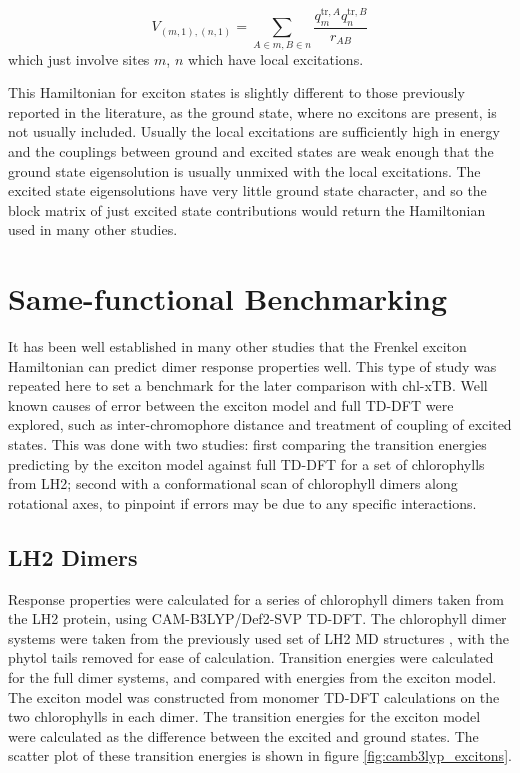 \begin{equation}
    V_{\left(m, 1\right), \left(n,1\right)} = \sum_{A \in m, B \in n} \frac{q^{\text{tr},A}_m q^{\text{tr},B}_n}{r_{AB}}
    \label{eq:exciton_coupling}
\end{equation}
%
which just involve sites $m$, $n$ which have local excitations.

This Hamiltonian for exciton states is slightly different to those previously reported 
in the literature, as the ground state, where no excitons are present, is not usually
included. Usually the local excitations are sufficiently high in energy and the
couplings between ground and excited states are weak enough that the ground state 
eigensolution is usually unmixed with the local excitations. The excited state eigensolutions
have very little ground state character, and so the block matrix of just excited
state contributions would return the Hamiltonian used in many other studies.

\section{Same-functional Benchmarking}
\label{sec:exction_v_full_dimer}

It has been well established in many other studies that the Frenkel exciton Hamiltonian
can predict dimer response properties well. This type of study was repeated here
to set a benchmark for the later comparison with chl-xTB. Well known causes of error
between the exciton model and full TD-DFT were explored, such as inter-chromophore
distance and treatment of coupling of excited states. This was done with two studies:
first comparing the transition energies predicting by the exciton model against 
full TD-DFT for a set of chlorophylls from LH2; second with a conformational scan
of chlorophyll dimers along rotational axes, to pinpoint if errors may be due to
any specific interactions.

\subsection{LH2 Dimers}
\label{subsec:LH2_exciton_camb3lyp}

Response properties were calculated for a series of chlorophyll dimers taken from
the LH2 protein, using CAM-B3LYP/Def2-SVP TD-DFT. The chlorophyll dimer systems
were taken from the previously used set of LH2 MD structures \cite{Stross2016},
with the phytol tails removed for ease of calculation. Transition energies were
calculated for the full dimer systems, and compared with energies from the exciton 
model. The exciton model was constructed from monomer TD-DFT calculations on the
two chlorophylls in each dimer. The transition energies for the exciton model were
calculated as the difference between the excited and ground states. The scatter
plot of these transition energies is shown in figure \ref{fig:camb3lyp_excitons}. 

